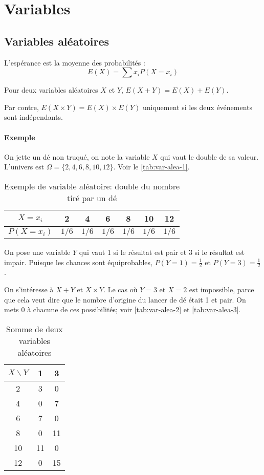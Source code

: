 \documentclass[10pt,a4paper,french]{article}
\begin{document}
\section{Variables}

\subsection{Variables aléatoires}

L'espérance est la moyenne des probabilités : \[ E(X) = \sum x_i P(X=x_i) \]

Pour deux variables aléatoires $X$ et $Y$, $E(X+Y) = E(X) + E(Y)$.

Par contre, $E(X \times Y) = E(X) \times E(Y)$ uniquement si les deux événements sont indépendants.

\paragraph{Exemple}

On jette un dé non truqué, on note la variable $X$ qui vaut le double de sa valeur. L'univers est $\Omega=\lbrace 2, 4, 6, 8, 10, 12 \rbrace$. Voir le \autoref{tab:var-alea-1}.

\begin{table}[h]
\caption{\label{tab:var-alea-1} Exemple de variable aléatoire: double du nombre tiré par un dé}
\centering
\begin{tabular}{c|cccccc}
$X=x_i$ & 2 & 4 & 6 & 8 & 10 & 12\\
\hline
$P(X=x_i)$ & $1/6$ & $1/6$ & $1/6$ & $1/6$ & $1/6$ & $1/6$\\
\end{tabular}
\end{table}

On pose une variable $Y$ qui vaut 1 si le résultat est pair et 3 si le résultat est impair. Puisque les chances sont équiprobables, $P(Y=1) = \frac{1}{2}$ et $P(Y=3) = \frac{1}{2}$.

On s'intéresse à $X+Y$ et $X \times Y$. Le cas où $Y=3$ et $X=2$ est impossible, parce que cela veut dire que le nombre d'origine du lancer de dé était 1 et pair. On mets 0 à chacune de ces possibilités; voir \autoref{tab:var-alea-2} et \autoref{tab:var-alea-3}.

\begin{table}[h]
\caption{\label{tab:var-alea-2} Somme de deux variables aléatoires}
\centering
\begin{tabular}{c|cc}
$X \backslash Y$ & 1 & 3\\
\hline
2 & 3 & 0\\
4 & 0 & 7\\
6 & 7 & 0\\
8 & 0 & 11\\
10 & 11 & 0\\
12 & 0 & 15\\
\end{tabular}
\end{table}
\end{document}
